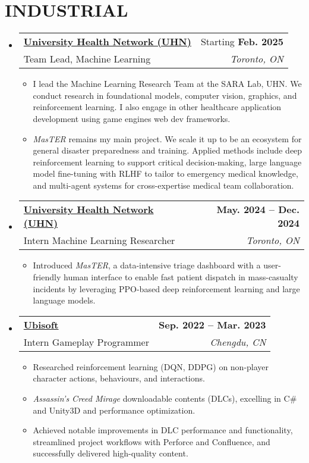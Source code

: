 \documentclass[letterpaper,11pt]{article}
\makeatletter
\newcommand{\resumeItem}[1]{
  \item\small{
    {#1 \vspace{-2pt}}
  }
}
\newcommand{\resumeSubheading}[4]{
  \vspace{-2pt}\item
    \begin{tabular*}{1.0\textwidth}[t]{l@{\extracolsep{\fill}}r}
      \textbf{\small{#1}} & {#2} \\
      {#3} & \textit{\small #4} \\
    \end{tabular*}\vspace{-7pt}
}
\newcommand{\resumeSubHeadingListStart}{\begin{itemize}[leftmargin=0.0in, label={}]}
\newcommand{\resumeSubHeadingListEnd}{\end{itemize}}
\newcommand{\resumeItemListStart}{\begin{itemize}}
\newcommand{\resumeItemListEnd}{\end{itemize}\vspace{-5pt}}
\makeatother
\begin{document}
\section{INDUSTRIAL}
  \resumeSubHeadingListStart
    \resumeSubheading
      {\href{https://temertysimcentre.com/surgical-artificial-intelligence-research-academy-sara/}{University Health Network (UHN)}}{Starting \textbf{Feb. 2025}}
      {Team Lead, Machine Learning}{Toronto, ON}
      \resumeItemListStart
        \resumeItem{I lead the Machine Learning Research Team at the SARA Lab, UHN. We conduct research in foundational models, computer vision, graphics, and reinforcement learning. I also engage in other healthcare application development using game engines web dev frameworks.}
        \resumeItem{\textit{MasTER} remains my main project. We scale it up to be an ecosystem for general disaster preparedness and training. Applied methods include deep reinforcement learning to support critical decision-making, large language model fine-tuning with RLHF to tailor to emergency medical knowledge, and multi-agent systems for cross-expertise medical team collaboration.}

      \resumeItemListEnd
    \resumeSubheading
      {\href{https://temertysimcentre.com/surgical-artificial-intelligence-research-academy-sara/}{University Health Network (UHN)}}{\textbf{May. 2024 -- Dec. 2024}}
      {Intern Machine Learning Researcher}{Toronto, ON}
      \resumeItemListStart
        \resumeItem{Introduced \textit{MasTER}, a data-intensive triage dashboard with a user-friendly human interface to enable fast patient dispatch in mass-casualty incidents by leveraging PPO-based deep reinforcement learning and large language models.}
      \resumeItemListEnd
    \resumeSubheading
      {\href{https://www.ubisoft.com/}{Ubisoft}}{\textbf{Sep. 2022 -- Mar. 2023}}
      {Intern Gameplay Programmer}{Chengdu, CN}
      \resumeItemListStart
        \resumeItem{Researched reinforcement learning (DQN, DDPG) on non-player character actions, behaviours, and interactions. }
        \resumeItem{\textit{Assassin's Creed Mirage} downloadable contents (DLCs), excelling in C\# and Unity3D and performance optimization. }
        \resumeItem{Achieved notable improvements in DLC performance and functionality, streamlined project workflows with Perforce and Confluence, and successfully delivered high-quality content. }
      \resumeItemListEnd
  \resumeSubHeadingListEnd

\vspace{-5pt}
\end{document}
